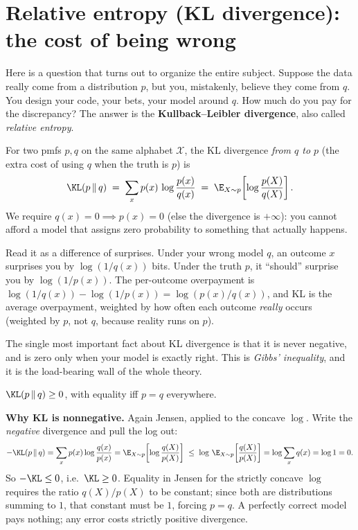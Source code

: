 \section{Relative entropy (KL divergence): the cost of being wrong}
\label{ch33:kl}

Here is a question that turns out to organize the entire subject. Suppose the data really come from a
distribution $p$, but you, mistakenly, believe they come from $q$. You design your code, your bets, your
model around $q$. How much do you pay for the discrepancy? The answer is the \textbf{Kullback--Leibler
divergence}, also called \emph{relative entropy}.

\begin{definition}[KL divergence]
\label{ch33:def-kl}
For two pmfs $p, q$ on the same alphabet $\mathcal{X}$, the KL divergence \emph{from $q$ to $p$} (the
extra cost of using $q$ when the truth is $p$) is
\[
  \KL(p \,\|\, q) \;=\; \sum_{x} p(x)\,\log\frac{p(x)}{q(x)}
                 \;=\; \E_{X \sim p}\!\left[\log\frac{p(X)}{q(X)}\right].
\]
We require $q(x) = 0 \implies p(x) = 0$ (else the divergence is $+\infty$): you cannot afford a model that
assigns zero probability to something that actually happens.
\end{definition}

\begin{intuitionbox}
Read it as a difference of surprises. Under your wrong model $q$, an outcome $x$ surprises you by
$\log(1/q(x))$ bits. Under the truth $p$, it ``should'' surprise you by $\log(1/p(x))$. The per-outcome
overpayment is $\log(1/q(x)) - \log(1/p(x)) = \log(p(x)/q(x))$, and KL is the average overpayment, weighted
by how often each outcome \emph{really} occurs (weighted by $p$, not $q$, because reality runs on $p$).
\end{intuitionbox}

The single most important fact about KL divergence is that it is never negative, and is zero only when
your model is exactly right. This is \emph{Gibbs' inequality}, and it is the load-bearing wall of the
whole theory.

\begin{theorem}
\label{ch33:gibbs}
$\KL(p\,\|\,q) \ge 0$, with equality iff $p = q$ everywhere.
\end{theorem}

\begin{whybox}
\textbf{Why KL is nonnegative.} Again Jensen, applied to the concave $\log$. Write the \emph{negative}
divergence and pull the log out:
\[
  -\KL(p\,\|\,q) = \sum_x p(x)\log\frac{q(x)}{p(x)}
               = \E_{X\sim p}\!\left[\log\frac{q(X)}{p(X)}\right]
               \;\le\; \log\,\E_{X\sim p}\!\left[\frac{q(X)}{p(X)}\right]
               = \log\sum_x q(x) = \log 1 = 0.
\]
So $-\KL \le 0$, i.e.\ $\KL \ge 0$. Equality in Jensen for the strictly concave $\log$ requires the ratio
$q(X)/p(X)$ to be constant; since both are distributions summing to $1$, that constant must be $1$, forcing
$p = q$. A perfectly correct model pays nothing; any error costs strictly positive divergence.
\end{whybox}

